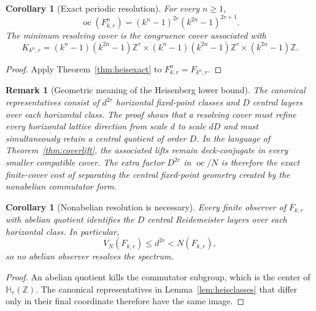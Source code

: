 \documentclass[11pt]{article}
\newtheorem{corollary}[theorem]{Corollary}
\newtheorem{remark}[theorem]{Remark}
\DeclareMathOperator{\oc}{oc}
\newcommand{\Z}{\mathbb Z}
\newcommand{\Heis}{\mathbb H}
\begin{document}
\begin{corollary}[Exact periodic resolution]
\label{cor:periodicresolution}
For every $n\ge1$,
\[
  \oc(F_{k,r}^n)
  =(k^n-1)^{2r}(k^{2n}-1)^{2r+1}.
\]
The minimum resolving cover is the congruence cover associated with
\[
  K_{k^n,r}
  =(k^n-1)(k^{2n}-1)\Z^r
  \times (k^n-1)(k^{2n}-1)\Z^r
  \times (k^{2n}-1)\Z.
\]
\end{corollary}

\begin{proof}
Apply Theorem~\ref{thm:heisexact} to $F_{k,r}^n=F_{k^n,r}$.
\end{proof}

\begin{remark}[Geometric meaning of the Heisenberg lower bound]
The canonical representatives consist of $d^{2r}$ horizontal fixed-point
classes and $D$ central layers over each horizontal class.  The proof shows
that a resolving cover must refine every horizontal lattice direction from
scale $d$ to scale $dD$ and must simultaneously retain a central quotient of
order $D$.  In the language of Theorem~\ref{thm:coverlift}, the associated
lifts remain deck-conjugate in every smaller compatible cover.  The extra
factor $D^{2r}$ in $\oc/N$ is therefore the exact finite-cover cost of
separating the central fixed-point geometry created by the nonabelian
commutator form.
\end{remark}

\begin{corollary}[Nonabelian resolution is necessary]
\label{cor:abelianblind}
Every finite observer of $F_{k,r}$ with abelian quotient identifies the
$D$ central Reidemeister layers over each horizontal class.  In particular,
\[
  V_N(F_{k,r})\le d^{2r}<N(F_{k,r}),
\]
so no abelian observer resolves the spectrum.
\end{corollary}

\begin{proof}
An abelian quotient kills the commutator subgroup, which is the center of
$\Heis_r(\Z)$.  The canonical representatives in
Lemma~\ref{lem:heisclasses} that differ only in their final coordinate
therefore have the same image.
\end{proof}
\end{document}
